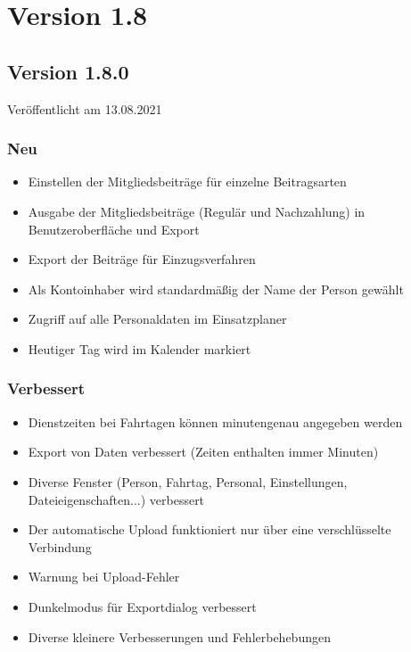 \section{Version 1.8}\label{version:1:8}
\subsection{Version 1.8.0}
\label{version:1:8:0}
Veröffentlicht am 13.08.2021
\subsubsection{Neu}
\begin{itemize}
  \item
  Einstellen der Mitgliedsbeiträge für einzelne Beitragsarten
  \item
  Ausgabe der Mitgliedsbeiträge (Regulär und Nachzahlung) in Benutzeroberfläche und Export
  \item
  Export der Beiträge für Einzugsverfahren
  \item
  Als Kontoinhaber wird standardmäßig der Name der Person gewählt
  \item
  Zugriff auf alle Personaldaten im Einsatzplaner
  \item
  Heutiger Tag wird im Kalender markiert
\end{itemize}

\subsubsection{Verbessert}
\begin{itemize}
  \item
  Dienstzeiten bei Fahrtagen können minutengenau angegeben werden
  \item
  Export von Daten verbessert (Zeiten enthalten immer Minuten)
  \item
  Diverse Fenster (Person, Fahrtag, Personal, Einstellungen, Dateieigenschaften...) verbessert
  \item
  Der automatische Upload funktioniert nur über eine verschlüsselte Verbindung
  \item
  Warnung bei Upload-Fehler
  \item
  Dunkelmodus für Exportdialog verbessert
  \item
  Diverse kleinere Verbesserungen und Fehlerbehebungen

\end{itemize}

